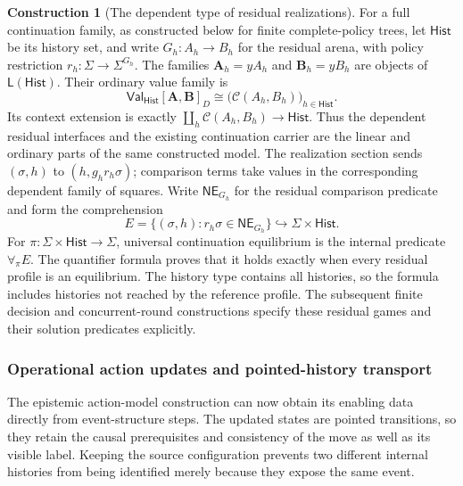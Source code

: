 \documentclass[11pt,a4paper]{article}
\numberwithin{equation}{section}
\theoremstyle{definition}
\newtheorem{construction}[construction]{Construction}
\theoremstyle{remark}
\theoremstyle{plain}
\begin{document}
\begin{construction}[The dependent type of residual realizations]
\label{con:fib-history-type}
For a full continuation family, as constructed below for finite
complete-policy trees, let $\mathsf{Hist}$ be its history set, and write
$G_h:A_h\to B_h$ for the residual arena,
with policy restriction
$r_h:\Sigma\to\Sigma^{G_h}$. The families $\mathbf A_h=yA_h$ and $\mathbf B_h=yB_h$ are objects
of $\mathsf L(\mathsf{Hist})$. Their ordinary value family is
\[
 \mathsf{Val}_{\mathsf{Hist}}[\mathbf A,\mathbf B]_D
 \cong\bigl(\mathcal C(A_h,B_h)\bigr)_{h\in\mathsf{Hist}}.
\]
Its context extension is exactly
$\coprod_h\mathcal C(A_h,B_h)\to\mathsf{Hist}$.
Thus the dependent residual interfaces and the existing continuation
carrier are the linear and ordinary parts of the same constructed model.
The realization section sends $(\sigma,h)$ to $(h,g_hr_h\sigma)$;
comparison terms take values in the corresponding dependent family of
squares. Write $\mathsf{NE}_{G_h}$ for the residual comparison
predicate and form the comprehension
\[
 E=\{(\sigma,h):r_h\sigma\in\mathsf{NE}_{G_h}\}
 \hookrightarrow\Sigma\times\mathsf{Hist}.
\]
For $\pi:\Sigma\times\mathsf{Hist}\to\Sigma$, universal continuation
equilibrium is the internal predicate $\forall_\pi E$.
The quantifier formula proves that it holds exactly when every residual
profile is an equilibrium. The history type contains all histories, so
the formula includes histories not reached by the reference profile.
The subsequent finite decision and concurrent-round constructions specify
these residual games and their solution predicates explicitly.
\end{construction}

\subsubsection{Operational action updates and pointed-history transport}
\label{sec:egt-operational-action-update}

The epistemic action-model construction can now obtain its
enabling data directly from event-structure steps. The updated states
are pointed transitions, so they retain the causal prerequisites and
consistency of the move as well as its visible label. Keeping the
source configuration prevents two different internal histories from
being identified merely because they expose the same event.
\end{document}
